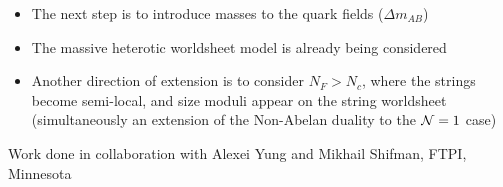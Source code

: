 \documentclass[12pt,letterpaper,landscape,KOMA,smallheadings,calcdimensions,display]{powersem}
\begin{document}
\begin{slide}
\vspace*{\fill}
\begin{itemize}
\item
	The next step is to introduce masses to the quark fields ($\Delta m_{AB}$)

\item 
	The massive heterotic worldsheet model is already being considered

\item 
	Another direction of extension is to consider $ N_F > N_c $, where the
	strings become semi-local, and size moduli appear on the string worldsheet
	(simultaneously an extension of the Non-Abelan duality to the $\mathcal{N}=1$
	case)
\end{itemize}	

\begin{center}
\fontsize{10pt}{10pt}\selectfont
	Work done in collaboration with Alexei Yung and Mikhail Shifman, FTPI, Minnesota
\end{center}
\vspace*{\fill}
\end{slide}
\end{document}
